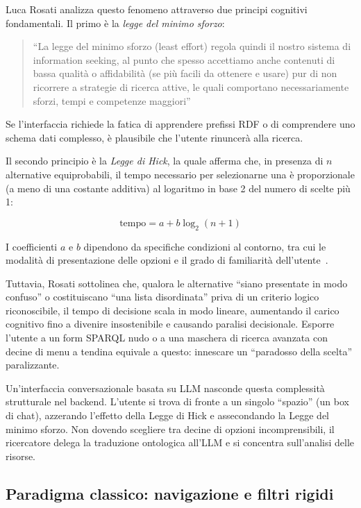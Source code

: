     Luca Rosati analizza questo fenomeno attraverso due principi cognitivi fondamentali. Il primo è la \textit{legge del minimo sforzo}:

    \begin{quotation}
    ``La legge del minimo sforzo (least effort) regola quindi il nostro sistema di information seeking, al punto che spesso accettiamo anche contenuti di bassa qualità o affidabilità (se più facili da ottenere e usare) pur di non ricorrere a strategie di ricerca attive, le quali comportano necessariamente sforzi, tempi e competenze maggiori''\hfill\cite{Ros07}
    \end{quotation}

    Se l'interfaccia richiede la fatica di apprendere prefissi RDF o di comprendere uno schema dati complesso, è plausibile che l'utente rinuncerà alla ricerca.

    Il secondo principio è la \textit{Legge di Hick}, la quale afferma che, in presenza di $n$ alternative equiprobabili, il tempo necessario per selezionarne una è proporzionale (a meno di una costante additiva) al logaritmo in base 2 del numero di scelte più 1:

    \[ \text{tempo} = a + b \log_2(n+1) \]

    I coefficienti $a$ e $b$ dipendono da specifiche condizioni al contorno, tra cui le modalità di presentazione delle opzioni e il grado di familiarità dell'utente~\cite{Ros07}.

    Tuttavia, Rosati sottolinea che, qualora le alternative ``siano presentate in modo confuso'' o costituiscano ``una lista disordinata'' priva di un criterio logico riconoscibile, il tempo di decisione scala in modo lineare, aumentando il carico cognitivo fino a divenire insostenibile e causando paralisi decisionale. Esporre l'utente a un form SPARQL nudo o a una maschera di ricerca avanzata con decine di menu a tendina equivale a questo: innescare un ``paradosso della scelta'' paralizzante.

    Un'interfaccia conversazionale basata su LLM nasconde questa complessità strutturale nel backend. L'utente si trova di fronte a un singolo ``spazio'' (un box di chat), azzerando l'effetto della Legge di Hick e assecondando la Legge del minimo sforzo. Non dovendo scegliere tra decine di opzioni incomprensibili, il ricercatore delega la traduzione ontologica all'LLM e si concentra sull'analisi delle risorse.

    \subsection{Paradigma classico: navigazione e filtri rigidi}\label{subsec:paradigma_classico}

